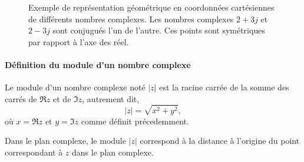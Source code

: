 \begin{figure}[!h]
\captionsetup{width=0.8\linewidth}
\begin{center}
\end{center}
    \caption{Exemple de représentation géométrique en coordonnées cartésiennes 
    de différents nombres complexes. Les nombres complexes $2+3j$ et $2-3j$
    sont conjugués l'un de l'autre. Ces points sont symétriques par rapport à l'axe des réel.
   \label{fig-plan_complexe}}
\end{figure}

\paragraph{Définition du module d'un nombre complexe}
Le module d'un nombre complexe noté $|z|$ est la 
racine carrée de la somme des carrés de $\Re{z}$ et de $\Im{z}$, 
autrement dit, 
$$
|z|=\sqrt{x^2+y^2},
$$
où $x=\Re{z}$ et $y=\Im{z}$ comme définit précedemment.

Dans le plan complexe, le module $|z|$ correspond à la distance à l'origine du 
point correspondant à $z$ dans le plan complexe.


